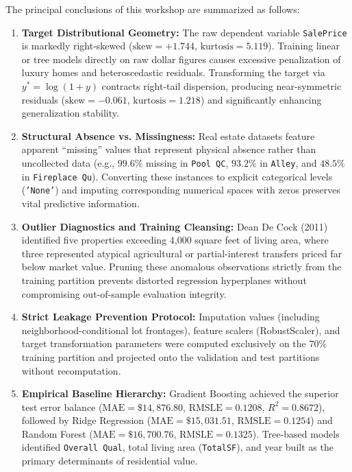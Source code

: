 \documentclass[11pt,a4paper]{article}
\begin{document}
The principal conclusions of this workshop are summarized as follows:
\begin{enumerate}
    \item \textbf{Target Distributional Geometry:} The raw dependent variable \texttt{SalePrice} is markedly right-skewed ($\text{skew} = +1.744$, $\text{kurtosis} = 5.119$). Training linear or tree models directly on raw dollar figures causes excessive penalization of luxury homes and heteroscedastic residuals. Transforming the target via $y^* = \log(1 + y)$ contracts right-tail dispersion, producing near-symmetric residuals ($\text{skew} = -0.061$, $\text{kurtosis} = 1.218$) and significantly enhancing generalization stability.
    \item \textbf{Structural Absence vs. Missingness:} Real estate datasets feature apparent ``missing'' values that represent physical absence rather than uncollected data (e.g., $99.6\%$ missing in \texttt{Pool QC}, $93.2\%$ in \texttt{Alley}, and $48.5\%$ in \texttt{Fireplace Qu}). Converting these instances to explicit categorical levels (\texttt{'None'}) and imputing corresponding numerical spaces with zeros preserves vital predictive information.
    \item \textbf{Outlier Diagnostics and Training Cleansing:} Dean De Cock (2011) identified five properties exceeding 4,000 square feet of living area, where three represented atypical agricultural or partial-interest transfers priced far below market value. Pruning these anomalous observations strictly from the training partition prevents distorted regression hyperplanes without compromising out-of-sample evaluation integrity.
    \item \textbf{Strict Leakage Prevention Protocol:} Imputation values (including neighborhood-conditional lot frontages), feature scalers (RobustScaler), and target transformation parameters were computed exclusively on the $70\%$ training partition and projected onto the validation and test partitions without recomputation.
    \item \textbf{Empirical Baseline Hierarchy:} Gradient Boosting achieved the superior test error balance ($\text{MAE} = \$14,876.80$, $\text{RMSLE} = 0.1208$, $R^2 = 0.8672$), followed by Ridge Regression ($\text{MAE} = \$15,031.51$, $\text{RMSLE} = 0.1254$) and Random Forest ($\text{MAE} = \$16,700.76$, $\text{RMSLE} = 0.1325$). Tree-based models identified \texttt{Overall Qual}, total living area (\texttt{TotalSF}), and year built as the primary determinants of residential value.
\end{enumerate}
\end{document}
